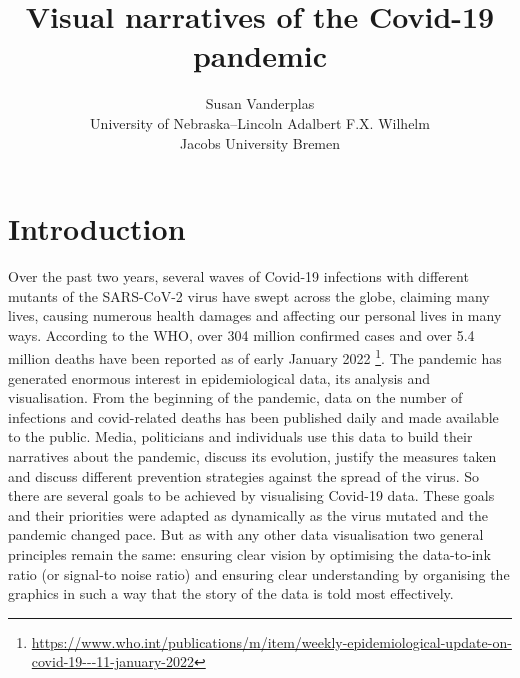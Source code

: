 \documentclass[article]{jdssv}\usepackage[]{graphicx}\usepackage[]{color}
\author{Susan Vanderplas\\University of Nebraska–Lincoln
   \And Adalbert F.X. Wilhelm\\Jacobs University Bremen}
\title{Visual narratives of the Covid-19 pandemic}
\begin{document}







\section{Introduction}

Over the past two years, several waves of Covid-19 infections with different mutants of the SARS-CoV-2 virus have swept across the globe, claiming many lives, causing numerous health damages and affecting our personal lives in many ways. According to the WHO, over 304 million confirmed cases and over 5.4 million deaths have been reported as of early January 2022 \footnote{\url{https://www.who.int/publications/m/item/weekly-epidemiological-update-on-covid-19---11-january-2022}}. The pandemic has generated enormous interest in epidemiological data, its analysis and visualisation. From the beginning of the pandemic, data on the number of infections and covid-related deaths has been published daily and made available to the public. Media, politicians and individuals use this data to build their narratives about the pandemic, discuss its evolution, justify the measures taken and discuss different prevention strategies against the spread of the virus. So there are several goals to be achieved by visualising Covid-19 data. These goals and their priorities were adapted as dynamically as the virus mutated and the pandemic changed pace. But as with any other data visualisation two general principles remain the same: ensuring clear vision by optimising the data-to-ink ratio \citep{Tufte2001} (or signal-to noise ratio) and ensuring clear understanding by organising the graphics in such a way that the story of the data is told most effectively.
\end{document}
